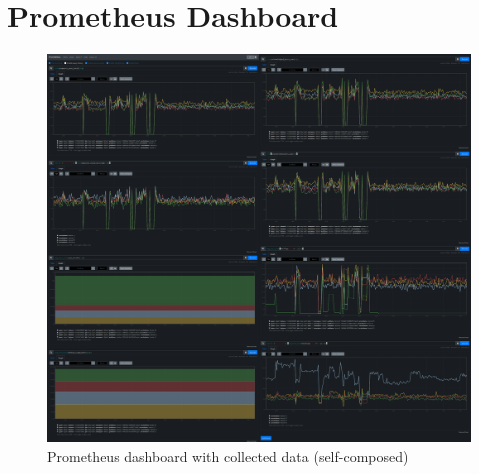\chapter{Prometheus Dashboard}\label{appendix:prometheus-dashboard}

\begin{figure}[H]
    \includegraphics[width=16.5cm]{assets/appendix/prometheus-dashboard.png}
    \caption{Prometheus dashboard with collected data (self-composed)}
\end{figure}